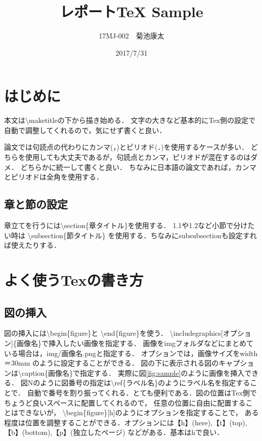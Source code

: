 \documentclass[titlepage,12pt,a4paper]{jarticle}
\title{レポートTeX Sample}
\date{2017/7/31}
\author{17MJ-002　菊池康太}
\begin{document}
\maketitle

\section{はじめに}
\label{sec:introduction}
本文は\textbackslash maketitleの下から描き始める．
文字の大きなど基本的にTex側の設定で自動で調整してくれるので，気にせず書くと良い．

論文では句読点の代わりにカンマ(，)とピリオド(．)を使用するケースが多い．
どちらを使用しても大丈夫であるが，句読点とカンマ，ピリオドが混在するのはダメ．
どちらかに統一して書くと良い．
ちなみに日本語の論文であれば，カンマとピリオドは全角を使用する．



\subsection{章と節の設定}
章立てを行うには\textbackslash section\{章タイトル\}を使用する．
1.1や1.2など小節で分けたい時は
\textbackslash subsection\{節タイトル\}
を使用する．ちなみにsubsubsectionも設定すれば使えたりする．




\section{よく使うTexの書き方}
\subsection{図の挿入}
図の挿入には\textbackslash begin\{figure\}と
\textbackslash end\{figure\}を使う．
\textbackslash includegraphics[オプション]\{画像名\}で挿入したい画像を指定する．
画像をimgフォルダなどにまとめている場合は，img/画像名.pngと指定する．
オプションでは，画像サイズをwidth＝30mm のように設定することができる．
図の下に表示される図のキャプションは\textbackslash caption\{画像名\}で指定する．
実際に図\ref{fig:sample}のように画像を挿入できる．
図Nのように図番号の指定は\textbackslash ref\{ラベル名\}のようにラベル名を指定することで．
自動で番号を割り振ってくれる．とても便利である．図の位置はTex側でちょうど良いスペースに配置してくれるので，
任意の位置に自由に配置することはできないが，
\textbackslash begin\{figure\}[h]のようにオプションを指定することで，
ある程度は位置を調整することができる．オプションには【h】(here),【t】(top),
【b】(bottom),【p】(独立したページ) などがある．基本はhで良い．
\end{document}
